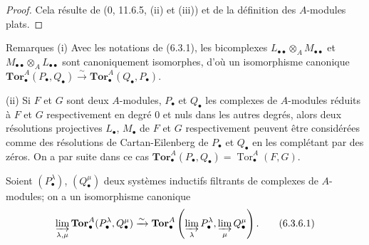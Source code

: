 \begin{proof}
Cela résulte de (0, 11.6.5, (ii) et (iii)) et de la définition des
$A$-modules plats.
\end{proof}

\begin{namedtheorem}[6.3.5]{Remarques}
(i) Avec les notations de (6.3.1), les bicomplexes
$L_{\bullet\bullet}\otimes_A M_{\bullet\bullet}$ et
$M_{\bullet\bullet}\otimes_A L_{\bullet\bullet}$ sont canoniquement
isomorphes, d'où un isomorphisme canonique
$\mathbf{Tor}_\bullet^A(P_\bullet,Q_\bullet)\xrightarrow{\sim}
\mathbf{Tor}_\bullet^A(Q_\bullet,P_\bullet)$.

(ii) Si $F$ et $G$ sont deux $A$-modules, $P_\bullet$ et $Q_\bullet$ les
complexes de $A$-modules réduits à $F$ et $G$ respectivement en degré 0 et
nuls dans les autres degrés, alors deux résolutions projectives $L_\bullet$,
$M_\bullet$ de $F$ et $G$ respectivement peuvent être considérées comme des
résolutions de Cartan-Eilenberg de $P_\bullet$ et $Q_\bullet$ en les
complétant par des zéros. On a par suite dans ce cas
$\mathbf{Tor}_\bullet^A(P_\bullet,Q_\bullet)
=\operatorname{Tor}_\bullet^A(F,G)$.
\end{namedtheorem}

\begin{proposition}[6.3.6]
Soient $(P_\bullet^\lambda)$, $(Q_\bullet^\mu)$ deux systèmes inductifs
filtrants de complexes de $A$-modules; on a un isomorphisme canonique
\[
  \varinjlim_{\lambda,\mu}
  \mathbf{Tor}_\bullet^A(P_\bullet^\lambda,Q_\bullet^\mu)
  \xrightarrow{\sim}
  \mathbf{Tor}_\bullet^A
  \left(\varinjlim_\lambda P_\bullet^\lambda,
        \varinjlim_\mu Q_\bullet^\mu\right).
  \tag{6.3.6.1}\label{III.6.3.6.1.fr}
\]
\end{proposition}

